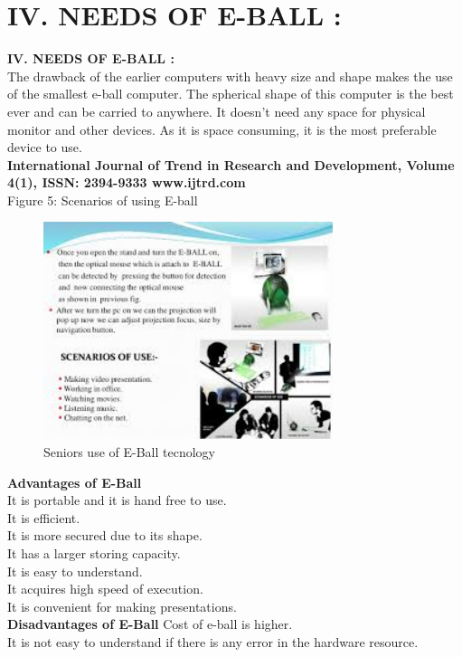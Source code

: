 \documentclass{article}
\begin{document}
 \section{IV. NEEDS OF E-BALL :}
 \textbf{IV. NEEDS OF E-BALL :}\\
 The drawback of the earlier computers with heavy size and shape makes the use of the smallest e-ball computer.  The spherical shape of this computer is the best ever and can be carried to anywhere. It doesn’t need any space for physical monitor and other devices. As it is space consuming, it is the most preferable device to use.\\
\textbf{ International Journal of Trend in Research and Development, Volume 4(1), ISSN: 2394-9333 www.ijtrd.com }\\
\newpage
Figure 5: Scenarios of using E-ball \\
\begin{figure}[h]
\centering
\includegraphics[height=2.5in]{index22.jpg}
\caption[optional caption]{ Seniors use of E-Ball tecnology}
\label{fig5: Seniors use of E-Ball tecnology}
\end{figure}
\textbf{Advantages of E-Ball}\\
  It is portable and it is hand free to use.\\
  It is efficient.\\
  It is more secured due to its shape.\\
  It has a larger storing capacity.\\ 
  It is easy to understand.\\
  It acquires high speed of execution.\\
  It is convenient for making presentations.\\
  \textbf{Disadvantages of E-Ball}
  Cost of e-ball is higher.\\
  It is not easy to understand if there is any error in the hardware resource.\\
  \newpage
\end{document}
